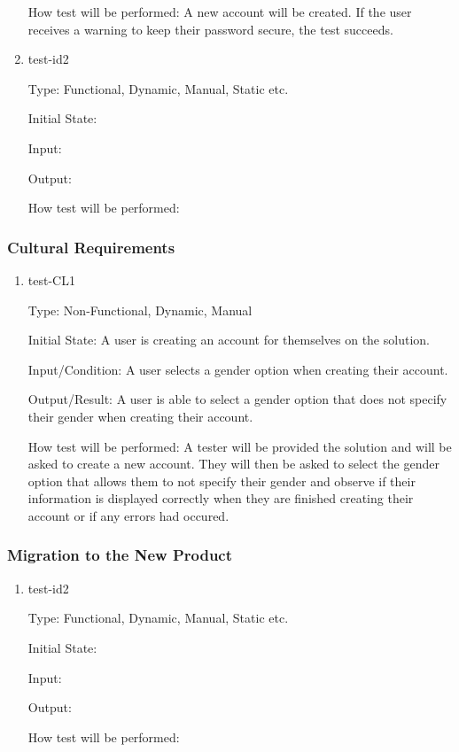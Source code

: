 \documentclass[12pt, titlepage]{article}
\begin{document}
\begin{enumerate}
  How test will be performed: A new account will be created. If the user 
  receives a warning to keep their password secure, the test succeeds.

  \item{test-id2\\}
  
  Type: Functional, Dynamic, Manual, Static etc.
            
  Initial State: 
            
  Input: 
            
  Output: 
            
  How test will be performed: 
  
\end{enumerate}

\subsubsection{Cultural Requirements}

\begin{enumerate}

  \item{test-CL1\\}
  
  Type: Non-Functional, Dynamic, Manual
            
  Initial State: A user is creating an account for themselves on the solution.
            
  Input/Condition: A user selects a gender option when creating their account.
            
  Output/Result: A user is able to select a gender option that does not specify their
  gender when creating their account.
            
  How test will be performed: A tester will be provided the solution and will be asked
  to create a new account. They will then be asked to select the gender option that allows
  them to not specify their gender and observe if their information is displayed correctly
  when they are finished creating their account or if any errors had occured.
  
\end{enumerate}

\subsubsection{Migration to the New Product}

\begin{enumerate}

  \item{test-id2\\}
  
  Type: Functional, Dynamic, Manual, Static etc.
            
  Initial State: 
            
  Input: 
            
  Output: 
            
  How test will be performed: 

\end{enumerate}
\end{document}
